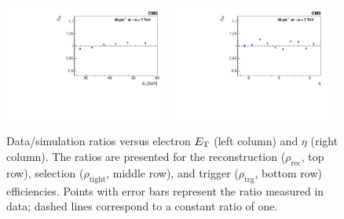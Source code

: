 \begin{figure}[htbp]
\begin{center}
  \includegraphics[width=0.48\textwidth]{figs/trigeff_scalept.pdf}
  \includegraphics[width=0.48\textwidth]{figs/trigeff_scaleeta.pdf}
 \end{center}
\caption{Data/simulation \TNP ratios versus electron $E\,\,_{\!\!\!\mathrm{T}}$ (left column) and $\eta$ (right column).
The ratios are presented for the reconstruction ($\rho_\mathrm{rec}$, top row), selection 
($\rho_\mathrm{tight}$, middle row), and trigger ($\rho_\mathrm{trg}$, bottom row) efficiencies.
Points with error bars represent the ratio measured in data; dashed lines correspond to a constant ratio of one.
\label{fig:e-TnPratios}}
\end{figure}


